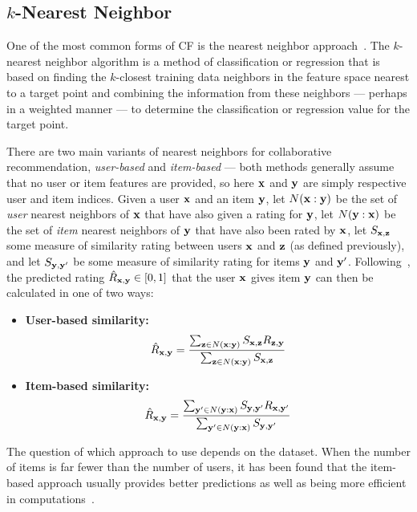 \subsection{$k$-Nearest Neighbor}

One of the most common forms of CF is the nearest neighbor
approach~\cite{bellkor}. The $k$-nearest neighbor algorithm is a
method of classification or regression that is based on finding the $k$-closest
training data neighbors in the feature space nearest to a target point and combining the information from these neighbors --- perhaps
in a weighted manner --- to determine the classification or regression value
for the target point. 

There are two main variants of nearest neighbors for collaborative
recommendation, \emph{user-based} and \emph{item-based} --- both
methods generally assume that no user or item features are provided,
so here $\mathbf{x}$ and $\mathbf{y}$ are simply respective user and item indices.
Given a user $\mathbf{x}$ and an item $\mathbf{y}$, let $N(\mathbf{x}:\mathbf{y})$ be the set of
\emph{user} nearest neighbors of $\mathbf{x}$ that have also given a rating
for $\mathbf{y}$, let $N(\mathbf{y}:\mathbf{x})$ be the set of \emph{item} nearest neighbors
of $\mathbf{y}$ that have also been rated by $\mathbf{x}$, let $S_{\mathbf{x},\mathbf{z}}$ some
measure of similarity rating between users $\mathbf{x}$ and $\mathbf{z}$ (as defined
previously), and let $S_{\mathbf{y},\mathbf{y}'}$ be some measure of similarity rating for
items $\mathbf{y}$ and $\mathbf{y}'$.  Following~\cite{bellkor}, the predicted rating
$\hat{R}_{\mathbf{x},\mathbf{y}} \in [0,1]$ that the user $\mathbf{x}$ gives item $\mathbf{y}$ can
then be calculated in one of two ways:
\begin{itemize}
\item {\bf User-based similarity:}
\[
\hat{R}_{\mathbf{x},\mathbf{y}} = \frac{\sum_{\mathbf{z} \in N(\mathbf{x}:\mathbf{y})} {S_{\mathbf{x},\mathbf{z}} R_{\mathbf{z},\mathbf{y}}} } {\sum_{\mathbf{z} \in N(\mathbf{x}:\mathbf{y})}{S_{\mathbf{x},\mathbf{z}}}}
\]
\item {\bf Item-based similarity:}
\[
\hat{R}_{\mathbf{x},\mathbf{y}} = \frac{\sum_{\mathbf{y}' \in N(\mathbf{y}:\mathbf{x})} {S_{\mathbf{y},\mathbf{y}'} R_{\mathbf{x},\mathbf{y}'}} } {\sum_{\mathbf{y}' \in N(\mathbf{y}:\mathbf{x})}{S_{\mathbf{y},\mathbf{y}'}}}
\]
\end{itemize}

The question of which approach to use depends on the dataset. When the
number of items is far fewer than the number of users, it has been
found that the item-based approach usually provides better predictions
as well as being more efficient in computations~\cite{bellkor}.

